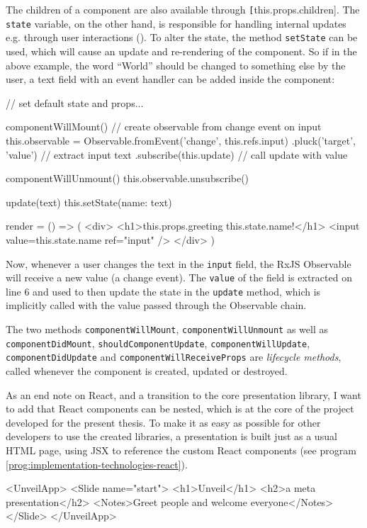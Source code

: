 %
The children of a component are also available through \texttt[this.props.children]. The \texttt{state} variable, on the other hand, is responsible for handling internal updates e.g. through user interactions (\cite{react-docu}). To alter the state, the method \texttt{setState} can be used, which will cause an update and re-rendering of the component. So if in the above example, the word ``World'' should be changed to something else by the user, a text field with an event handler can be added inside the component:
%
\begin{JsCode}
// set default state and props...

componentWillMount() {
  // create observable from change event on input
  this.observable = Observable.fromEvent('change', this.refs.input)
    .pluck('target', 'value') // extract input text
    .subscribe(this.update) // call update with value
}

componentWillUnmount() { this.observable.unsubscribe() }

update(text) { this.setState({name: text}) }

render = () => (
  <div>
    <h1>{this.props.greeting} {this.state.name}!</h1>
    <input value={this.state.name} ref="input" />
  </div>
)
\end{JsCode}
%
Now, whenever a user changes the text in the \texttt{input} field, the RxJS Observable will receive a new value (a change event). The \texttt{value} of the field is extracted on line $6$ and used to then update the state in the \texttt{update} method, which is implicitly called with the value passed through the Observable chain.

The two methods \texttt{com\-po\-nent\-Will\-Mount}, \texttt{com\-po\-nent\-Will\-Un\-mount} as well as \texttt{com\-po\-nent\-Did\-Mount}, \texttt{should\-Com\-po\-nent\-Up\-date}, \texttt{com\-po\-nent\-Will\-Up\-date}, \texttt{com\-po\-nent\-Did\-Up\-date} and \texttt{com\-po\-nent\-Will\-Re\-ceive\-Props} are \emph{lifecycle methods}, called whenever the component is created, updated or destroyed.

As an end note on React, and a transition to the core presentation library, I want to add that React components can be nested, which is at the core of the project developed for the present thesis. To make it as easy as possible for other developers to use the created libraries, a presentation is built just as a usual HTML page, using JSX to reference the custom React components (see program \ref{prog:implementation-technologies-react}).
%
\begin{program}
\caption{Nested React components. In this example, a 1-slide-long presentation is created.}
\label{prog:implementation-technologies-react}
\begin{JsCode}
<UnveilApp>
  <Slide name="start">
    <h1>Unveil</h1>
    <h2>a meta presentation</h2>
    <Notes>Greet people and welcome everyone</Notes>
  </Slide>
</UnveilApp>
\end{JsCode}
\end{program}

